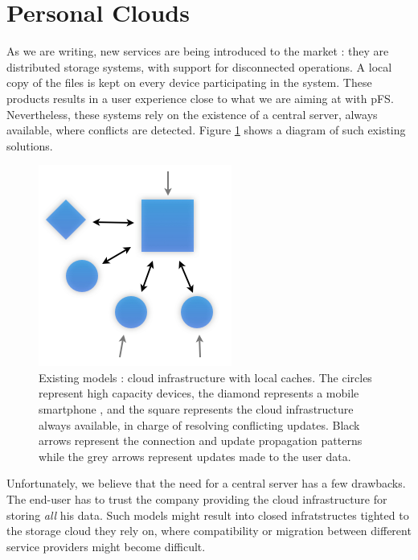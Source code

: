 
\section{Personal Clouds}
\label{sec:model}

As we are writing, new services are being introduced to the
market : they are distributed storage systems, with support for
disconnected operations. A local copy of the files is kept on every
device participating in the system. These products results in a user
experience close to what we are aiming at with pFS. Nevertheless, these
systems rely on the existence of a central server, always available,
where conflicts are detected. Figure \ref{OthModel} shows a diagram of
such existing solutions.

\begin{figure}[ht]
\begin{center}
  \includegraphics [scale=0.5] {img/other_model}
  \caption{\label{OthModel}
    {\small Existing models : cloud infrastructure with local
      caches. The circles represent high capacity devices, the
      diamond represents a mobile smartphone , and the square
      represents the cloud infrastructure always available, in charge
      of resolving conflicting updates. Black arrows represent the
      connection and update propagation patterns while the grey arrows
      represent updates made to the user data.}}
\end{center}
\end{figure}

Unfortunately, we believe that the need for a central server has a few
drawbacks. The end-user has to trust the company providing the cloud
infrastructure for storing \emph{all} his data. Such models might
result into closed infratstructes tighted to the storage cloud
they rely on, where compatibility or migration between different
service providers might become difficult.

